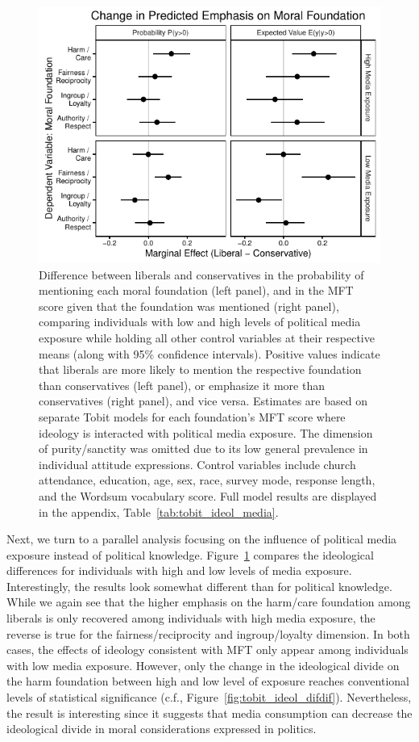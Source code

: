 \documentclass[12pt]{article}
\begin{document}
\begin{figure}[ht]\centering
\includegraphics{../calc/fig/tobit_ideol_media.pdf}
\caption{Difference between liberals and conservatives in the probability of mentioning each moral foundation (left panel), and in the MFT score given that the foundation was mentioned (right panel), comparing individuals with low and high levels of political media exposure while holding all other control variables at their respective means (along with 95\% confidence intervals). Positive values indicate that liberals are more likely to mention the respective foundation than conservatives (left panel), or emphasize it more than conservatives (right panel), and vice versa. Estimates are based on separate Tobit models for each foundation's MFT score where ideology is interacted with political media exposure. The dimension of purity/sanctity was omitted due to its low general prevalence in individual attitude expressions. Control variables include church attendance, education, age, sex, race, survey mode, response length, and the Wordsum vocabulary score. Full model results are displayed in the appendix, Table~\ref{tab:tobit_ideol_media}.}\label{fig:tobit_ideol_media}
\end{figure}

Next, we turn to a parallel analysis focusing on the influence of political media exposure instead of political knowledge. Figure~\ref{fig:tobit_ideol_media} compares the ideological differences for individuals with high and low levels of media exposure. Interestingly, the results look somewhat different than for political knowledge. While we again see that the higher emphasis on the harm/care foundation among liberals is only recovered among individuals with high media exposure, the reverse is true for the fairness/reciprocity and ingroup/loyalty dimension. In both cases, the effects of ideology consistent with MFT only appear among individuals with low media exposure. However, only the change in the ideological divide on the harm foundation between high and low level of exposure reaches conventional levels of statistical significance (c.f., Figure~\ref{fig:tobit_ideol_difdif}). Nevertheless, the result is interesting since it suggests that media consumption can decrease the ideological divide in moral considerations expressed in politics.
\end{document}
